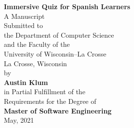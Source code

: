 \begin{titlepage}
	\begin{center}
		\vspace*{0.5in}
		\begin{doublespace}
			\LARGE \textbf{Immersive Quiz for Spanish Learners} \\
			\vspace*{1in}
			\normalsize
			A Manuscript \\
			Submitted to \\
			the Department of Computer Science \\
			and the Faculty of the\\
			University of Wisconsin--La Crosse \\
			La Crosse, Wisconsin \\
			\vspace*{0.5in}
			by \\
			\large
			\textbf{Austin Klum} \\

			\vspace*{0.5in}
			\normalsize
			in Partial Fulfillment of the \\
			Requirements for the Degree of\\
			\Large{\textbf{Master of Software Engineering}} \\
			\normalsize
			May, 2021
		\end{doublespace}
	\end{center}
\end{titlepage}
